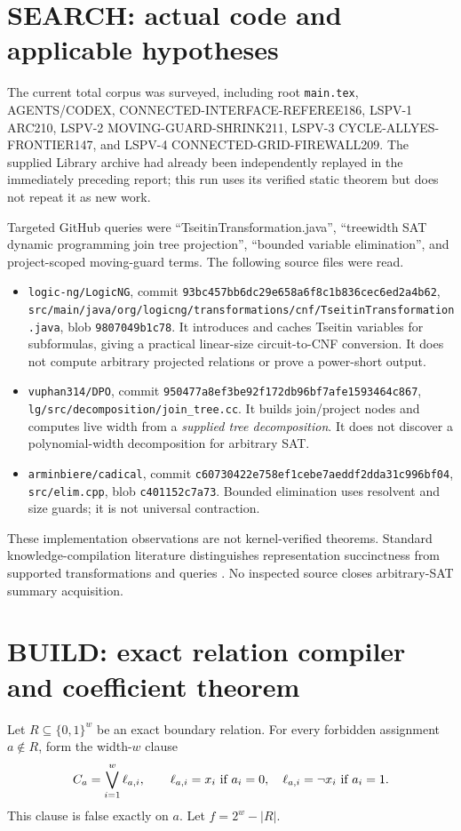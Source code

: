 \documentclass[11pt]{article}
\begin{document}
\section{SEARCH: actual code and applicable hypotheses}
The current total corpus was surveyed, including root \texttt{main.tex},
AGENTS/CODEX, CONNECTED-INTERFACE-REFEREE186, LSPV-1 ARC210, LSPV-2
MOVING-GUARD-SHRINK211, LSPV-3 CYCLE-ALLYES-FRONTIER147, and LSPV-4
CONNECTED-GRID-FIREWALL209.  The supplied Library archive had already been
independently replayed in the immediately preceding report; this run uses its
verified static theorem but does not repeat it as new work.

Targeted GitHub queries were ``TseitinTransformation.java'', ``treewidth SAT
dynamic programming join tree projection'', ``bounded variable elimination'',
and project-scoped moving-guard terms.  The following source files were read.
\begin{itemize}
\item \texttt{logic-ng/LogicNG}, commit
\texttt{93bc457bb6dc29e658a6f8c1b836cec6ed2a4b62},
\texttt{src/main/java/org/logicng/transformations/cnf/TseitinTransformation.java},
blob \texttt{9807049b1c78}.  It introduces and caches Tseitin variables for
subformulas, giving a practical linear-size circuit-to-CNF conversion.  It
does not compute arbitrary projected relations or prove a power-short output.
\item \texttt{vuphan314/DPO}, commit
\texttt{950477a8ef3be92f172db96bf7afe1593464c867},
\texttt{lg/src/decomposition/join\_tree.cc}.  It builds join/project nodes and
computes live width from a \emph{supplied tree decomposition}.  It does not
discover a polynomial-width decomposition for arbitrary SAT.
\item \texttt{arminbiere/cadical}, commit
\texttt{c60730422e758ef1cebe7aeddf2dda31c996bf04},
\texttt{src/elim.cpp}, blob \texttt{c401152c7a73}.  Bounded elimination uses
resolvent and size guards; it is not universal contraction.
\end{itemize}
These implementation observations are not kernel-verified theorems.  Standard
knowledge-compilation literature distinguishes representation succinctness
from supported transformations and queries \cite{dm}.  No inspected source
closes arbitrary-SAT summary acquisition.

\section{BUILD: exact relation compiler and coefficient theorem}
Let $R\subseteq\{0,1\}^w$ be an exact boundary relation.  For every forbidden
assignment $a\notin R$, form the width-$w$ clause
\[
 C_a=\bigvee_{i=1}^w \ell_{a,i},\qquad
 \ell_{a,i}=x_i\ \hbox{if }a_i=0,
 \quad \ell_{a,i}=\neg x_i\ \hbox{if }a_i=1.
\]
This clause is false exactly on $a$.  Let $f=2^w-|R|$.
\end{document}
